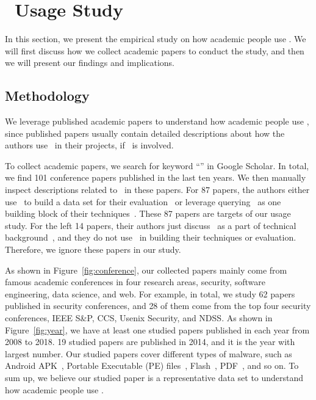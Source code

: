 \section{\vt\ Usage Study}
\label{sec:label}

In this section, we present the empirical study on how 
academic people use \vt. 
We will first discuss how we collect academic papers to conduct the study, 
and then we will present our findings and implications. 

\subsection{Methodology}

We leverage published academic papers to understand 
how academic people use \vt,
since published papers usually contain detailed descriptions 
about how the authors use \vt\ in their projects, if \vt\ is involved. 

To collect academic papers, we search for keyword ``\vt'' in Google Scholar. 
In total, we find 101 conference papers published in the last ten years.
We then manually inspect descriptions related to \vt\ in these papers. 
For 87 papers, the authors either use \vt\ 
to build a data set for their evaluation~\cite{ford2009analyzing,android-1,email-vt-1,kharraz2016unveil} 
or leverage querying \vt\ as one building block of their
techniques~\cite{vt-component-1,vt-component-2,vt-component-3}. 
These 87 papers are targets of our \vt{} usage study. 
For the left 14 papers, their authors just discuss \vt\ as a part 
of technical background~\cite{not-use-1,bayer2009scalable,jiang2012dissecting}, and 
they do not use \vt\ in building their techniques or evaluation. 
Therefore, we ignore these papers in our study. 




As shown in Figure~\ref{fig:conference}, 
our collected papers mainly come from famous academic conferences 
in four research areas, security, software engineering, data science, and web. 
For example, in total, we study 62 papers published in security conferences,
and 28 of them come from the top four security conferences, 
IEEE S\&P, CCS, Usenix Security, and NDSS.
As shown in Figure~\ref{fig:year}, 
we have at least one studied papers 
published in each year from 2008 to 2018. 
19 studied papers are published in 2014, 
and it is the year with largest number. 
Our studied papers cover different types of malware, 
such as Android APK~\cite{android-1,arp2014drebin,huangvt2016bigdata}, 
Portable Executable (PE) files~\cite{bayer2009scalable,pe-vt-1,pe-vt-2}, 
Flash~\cite{ford2009analyzing,wressnegger2017looking}, 
PDF~\cite{pdf-vt-1,carmony2016extract}, and so on. 
To sum up, we believe our studied paper is a representative data set 
to understand how academic people use \vt{}. 

